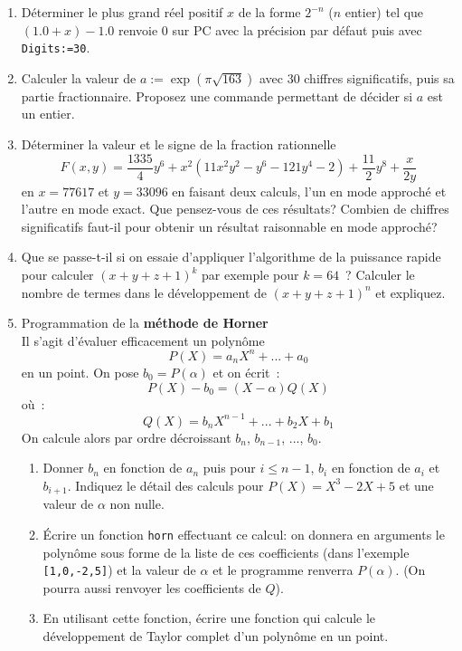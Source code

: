 \documentclass[a4paper,11pt]{article}
\begin{document}
\begin{giacjshere}
\begin{enumerate}
\item D\'eterminer le plus grand r\'eel positif $x$ de la forme 
$2^{-n}$ ($n$ entier)
tel que $(1.0+x)-1.0$ renvoie 0 sur PC avec la pr\'ecision par
d\'efaut puis avec \verb|Digits:=30|.
\item Calculer la valeur de $a:=\exp(\pi \sqrt{163})$ avec 30 chiffres
significatifs, puis sa partie fractionnaire. Proposez une commande
permettant de d\'ecider si $a$ est un entier.
\item 
D\'eterminer la valeur et le signe de la fraction rationnelle 
\[ F(x,y)= \frac{1335}{4} y^6 + x^2 (11x^2 y^2-y^6 -121y^4-2) + 
\frac{11}{2} y^8 + \frac{x}{2y}\]
en $x=77617$ et $y=33096$ en faisant deux calculs, l'un en mode approch\'e et 
l'autre en mode exact. Que pensez-vous de ces r\'esultats?
Combien de chiffres significatifs faut-il pour obtenir un r\'esultat
raisonnable en mode approch\'e?
\item Que se passe-t-il si on essaie d'appliquer l'algorithme de la
puissance rapide pour calculer $(x+y+z+1)^{k}$ par exemple pour
$k=64$~? 
Calculer le nombre
de termes dans le d\'eveloppement de $(x+y+z+1)^n$ et expliquez.
\item Programmation de la {\bf m\'ethode de Horner}\\
Il s'agit d'\'evaluer efficacement un polyn\^ome 
\[ P(X) = a_n X^n + ... + a_0 \]
en un point.
On pose $b_0=P(\alpha )$ et on \'ecrit~:
\[ P(X)-b_0=(X-\alpha )Q(X) \]
o\`u~:
\[ Q(X) = b_n X^{n-1} + ... +b_2 X + b_1 \]
On calcule alors par ordre d\'ecroissant $b_n$, $b_{n-1}$, ..., $b_0$.
\begin{enumerate}
\item
Donner $b_n$ en fonction de $a_n$ puis pour $i\leq n-1$, $b_i$
en fonction de $a_i$ et $b_{i+1}$. Indiquez le d\'etail des calculs
pour $P(X)=X^3-2X+5$ et une valeur de $\alpha $ non nulle.
\item \'Ecrire un fonction \verb|horn| effectuant ce calcul:
on donnera en arguments le polyn\^ome sous forme de la
liste de ces coefficients (dans l'exemple \verb|[1,0,-2,5]|) et la
valeur de $\alpha $ et le programme renverra $P(\alpha )$.
(On pourra aussi renvoyer les coefficients de $Q$).
\item
En utilisant cette fonction, \'ecrire une fonction qui calcule
le d\'eveloppement de Taylor complet d'un polyn\^ome en un point.
\end{enumerate}



\end{enumerate}
\end{giacjshere}
\end{document}
